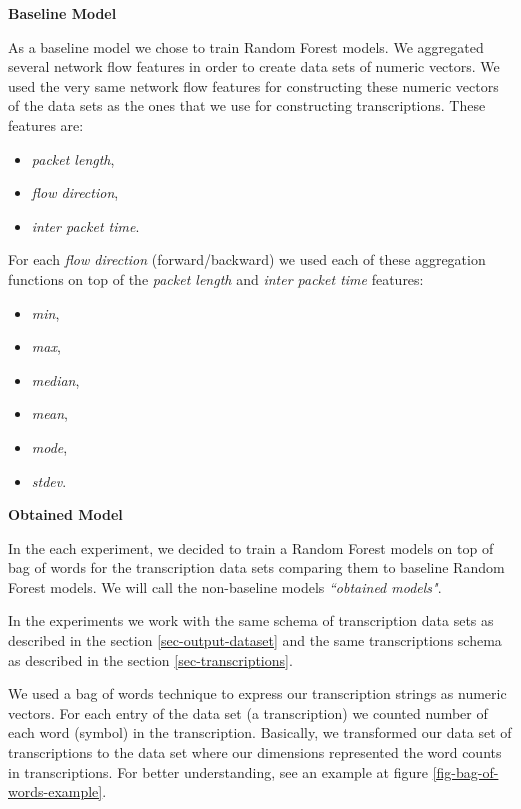 \documentclass{article}
\begin{document}
\noindent\textbf{Baseline Model}

As a baseline model we chose to train Random Forest models. We aggregated several network flow features in order to create data sets of numeric vectors. We used the very same network flow features for constructing these numeric vectors of the data sets as the ones that we use for constructing transcriptions. These features are:

\begin{itemize}
    \item \textit{packet length},
    \item \textit{flow direction},
    \item \textit{inter packet time}.
\end{itemize}

\noindent For each \textit{flow direction} (forward/backward) we used each of these aggregation functions on top of the \textit{packet length} and \textit{inter packet time} features:

\begin{itemize}
    \item \textit{min},
    \item \textit{max},
    \item \textit{median},
    \item \textit{mean},
    \item \textit{mode},
    \item \textit{stdev}.
\end{itemize}

\vspace{0.5cm}


\noindent\textbf{Obtained Model}

In the each experiment, we decided to train a Random Forest models on top of bag of words for the transcription data sets comparing them to baseline Random Forest models. We will call the non-baseline models \textit{``obtained models"}.

In the experiments we work with the same schema of transcription data sets as described in the section \ref{sec-output-dataset} and the same transcriptions schema as described in the section \ref{sec-transcriptions}.

We used a bag of words technique to express our transcription strings as numeric vectors. For each entry of the data set (a transcription) we counted number of each word (symbol) in the transcription. Basically, we transformed our data set of transcriptions to the data set where our dimensions represented the word counts in transcriptions. For better understanding, see an example at figure \ref{fig-bag-of-words-example}.
\end{document}
